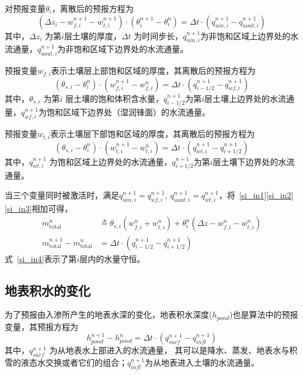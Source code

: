 对预报变量$\theta_i$，离散后的预报方程为
\begin{equation}\label{si_in1}
\left(\Delta z_{i}-w_{f, i}^{n+1}-w_{t, i}^{n+1}\right) \cdot\left(\theta_{i}^{n+1}-\theta_{i}^{n}\right)=\Delta t \cdot\left(q_{ {uin,i }}^{n+1}-q_{uout,i}^{n+1}\right)
\end{equation}
其中，$\Delta z_i$ 为第$ i $层土壤的厚度，$\Delta t$ 为时间步长，$q_{uin,i}^{n+1}$为非饱和区域上边界处的水流通量，$q_{uout,i}^{n+1}$为非饱和区域下边界处的水流通量。


预报变量$w_{f,i}$表示土壤层上部饱和区域的厚度，其离散后的预报方程为
\begin{equation}\label{si_in2}
\left(\theta_{s, i}-\theta_{i}^{n}\right) \cdot\left(w_{f, i}^{n+1}-w_{f, i}^{n}\right)=\Delta t \cdot\left(q_{i-1/2}^{n+1}-q_{w f, i}^{n+1}\right)
\end{equation}
其中，$\theta_{s,i}$ 为第$ i$ 层土壤的饱和体积含水量，$ q_{{i-1/2}}^{n+1}$为第$i$层土壤上边界处的水流通量，$q_{wf,i}^{n+1}$为饱和区域下边界处（湿润锋面）的水流通量。


预报变量$w_{t,i}$表示土壤层下部饱和区域的厚度，其离散后的预报方程为
\begin{equation}\label{si_in3}
\left(\theta_{s, i}-\theta_{i}^{n}\right) \cdot\left(w_{t, i}^{n+1}-w_{t, i}^{n}\right)=\Delta t \cdot\left(q_{w t, i}^{n+1}-q_{i+1 / 2}^{n+1}\right)
\end{equation}
其中，$q_{wt,i}^{n+1}$  为饱和区域上边界处的水流通量，$q_{i+1/2}^{n+1}$为第$i$层土壤下边界处的水流通量。

当三个变量同时被激活时，满足$q_{ {uin,i }}^{n+1}=q_{w f, i}^{n+1},~ q_{ {uout,i }}^{n+1}=q_{wt, i}^{n+1}$，将~\eqref{si_in1}\eqref{si_in2}\eqref{si_in3}相加可得，
\begin{equation}\label{si_in4}
\begin{aligned}
m_{\mathrm{total}}^n & \triangleq \theta_{s, i}\left(w_{f, i}^n+w_{t, i}^{n}\right)+\theta_{i}^{n}\left(\Delta z - w_{f, i}^{n} - w_{t, i}^{n}\right) \\
    m_{\mathrm{total}}^{n+1} - m_{\mathrm{total}}^n & =\Delta t \cdot\left(q_{i-1/2}^{n+1}-q_{i+1 / 2}^{n+1}\right)
\end{aligned}
\end{equation}
式~\eqref{si_in4}表示了第$i$层内的水量守恒。

\subsection{地表积水的变化}
为了预报由入渗所产生的地表水深的变化，地表积水深度($h_{pond}$)也是算法中的预报变量，其预报方程为
\begin{equation}\label{hpond}
h_{ {pond }}^{n+1}-h_{ {pond }}^{n}=\Delta t \cdot\left(q_{ {surf }}^{n+1}-q_{ {infl }}^{n+1}\right)
\end{equation}
其中，$q_{surf}^{n+1} $ 为从地表水上部进入的水流通量，
其可以是降水、蒸发、地表水与积雪的液态水交换或者它们的组合；$q_{infl}^{n+1}$为从地表进入土壤的水流通量。


